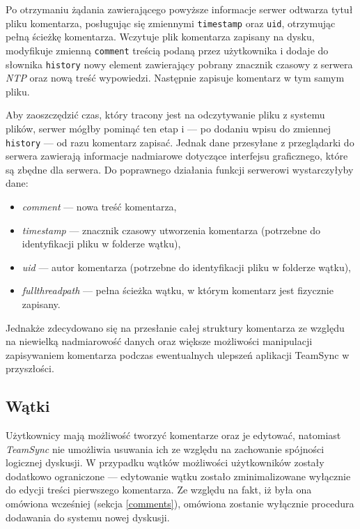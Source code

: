\documentclass[polish,a4paper,twoside]{ppfcmthesis}
\begin{document}
Po otrzymaniu żądania zawierającego powyższe informacje serwer odtwarza tytuł pliku komentarza, posługując się zmiennymi \texttt{timestamp} oraz \texttt{uid}, otrzymując pełną ścieżkę komentarza. Wczytuje plik komentarza zapisany na dysku, modyfikuje zmienną \texttt{comment} treścią podaną przez użytkownika i dodaje do słownika \texttt{history} nowy element zawierający pobrany znacznik czasowy z serwera \emph{NTP} oraz nową treść wypowiedzi. Następnie zapisuje komentarz w tym samym pliku.

Aby zaoszczędzić czas, który tracony jest na odczytywanie pliku z systemu plików, serwer mógłby pominąć ten etap i --- po dodaniu wpisu do zmiennej \texttt{history} --- od razu komentarz zapisać. Jednak dane przesyłane z przeglądarki do serwera zawierają informacje nadmiarowe dotyczące interfejsu graficznego, które są zbędne dla serwera. Do poprawnego działania funkcji serwerowi wystarczyłyby dane:

\begin{itemize}[noitemsep]
  \item \emph{comment} --- nowa treść komentarza,
  
  \item \emph{timestamp} --- znacznik czasowy utworzenia komentarza (potrzebne do identyfikacji pliku w folderze wątku),
  
  \item \emph{uid} --- autor komentarza (potrzebne do identyfikacji pliku w folderze wątku),
  
  \item \emph{fullthreadpath} --- pełna ścieżka wątku, w którym komentarz jest fizycznie zapisany.
\end{itemize}

Jednakże zdecydowano się na przesłanie całej struktury komentarza ze względu na niewielką nadmiarowość danych oraz większe możliwości manipulacji zapisywaniem komentarza podczas ewentualnych ulepszeń aplikacji TeamSync w przyszłości.

\subsection{Wątki}

Użytkownicy mają możliwość tworzyć komentarze oraz je edytować, natomiast \emph{TeamSync} nie umożliwia usuwania ich ze względu na zachowanie spójności logicznej dyskusji. W przypadku wątków możliwości użytkowników zostały dodatkowo ograniczone --- edytowanie wątku zostało zminimalizowane wyłącznie do edycji treści pierwszego komentarza. Ze względu na fakt, iż była ona omówiona wcześniej (sekcja \ref{comments}), omówiona zostanie wyłącznie procedura dodawania do systemu nowej dyskusji.
\end{document}
